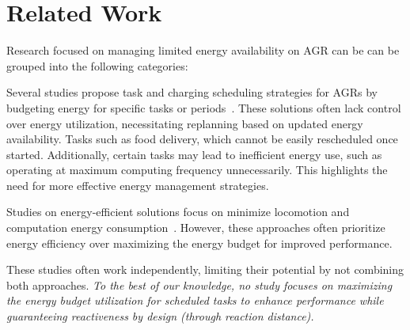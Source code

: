 \section{Related Work}
\vspace{-1mm}
\label{sec:related}


Research focused on managing limited energy availability on AGR can be can be grouped into the following categories:

 Several studies propose task and charging scheduling strategies for AGRs by budgeting energy for specific tasks or periods~\cite{tcm, 9981285, 9636815, Boccia_Masone_Sterle_Murino_2023, Chen_Xie_2022, 7294146, McGowen_Dagli_Dantam_Belviranli_2024, tcm_m}. These solutions often lack control over energy utilization, necessitating replanning based on updated energy availability. Tasks such as food delivery, which cannot be easily rescheduled once started. Additionally, certain tasks may lead to inefficient energy use, such as operating at maximum computing frequency unnecessarily. This highlights the need for more effective energy management strategies.

 Studies  on energy-efficient solutions focus on minimize  locomotion and computation energy consumption~\cite{Lamini_Benhlima_Elbekri_2018, Kim_Kim_2014, Li_Wang_Chen_Kan_Yu_2023, Di_Franco_Buttazzo_2015, 6385568,e2m, Rossi_Vaquero_Sanchez_Net_da_Silva_Vander_Hook_2020, Tang_Shah_Michmizos_2019, eemrc}. However, these approaches often prioritize energy efficiency over maximizing the energy budget for improved performance.

These studies often work independently, limiting their potential by not combining both approaches. \textit{To the best of our knowledge, no study focuses on maximizing the energy budget utilization for scheduled tasks to enhance performance while guaranteeing reactiveness by design (through reaction distance).} 



\vspace{-1mm}